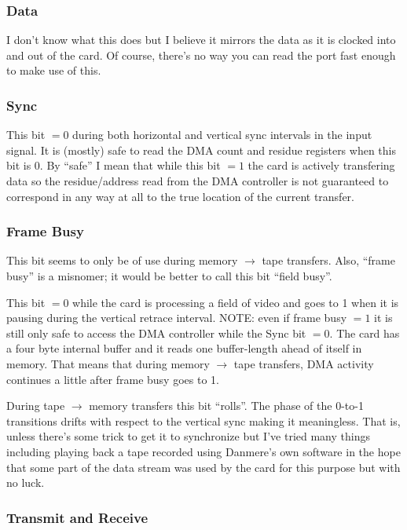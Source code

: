 \documentclass{article}
\begin{document}
\subsubsection{Data}

I don't know what this does but I believe it mirrors the data as it is
clocked into and out of the card.  Of course, there's no way you can read
the port fast enough to make use of this.


\subsubsection{Sync}

This bit \(= 0\) during both horizontal and vertical sync intervals in the
input signal.  It is (mostly) safe to read the DMA count and residue
registers when this bit is 0.  By ``safe'' I mean that while this bit \(=
1\) the card is actively transfering data so the residue/address read from
the DMA controller is not guaranteed to correspond in any way at all to the
true location of the current transfer.


\subsubsection{Frame Busy}

This bit seems to only be of use during memory \(\longrightarrow\) tape
transfers.  Also, ``frame busy'' is a misnomer;  it would be better to call
this bit ``field busy''.

This bit \(= 0\) while the card is processing a field of video and goes to
1 when it is pausing during the vertical retrace interval.  NOTE:  even if
frame busy \(= 1\) it is still only safe to access the DMA controller while
the Sync bit \(= 0\).  The card has a four byte internal buffer and it
reads one buffer-length ahead of itself in memory.  That means that during
memory \(\longrightarrow\) tape transfers, DMA activity continues a little
after frame busy goes to 1.

During tape \(\longrightarrow\) memory transfers this bit ``rolls''.  The
phase of the 0-to-1 transitions drifts with respect to the vertical sync
making it meaningless.  That is, unless there's some trick to get it to
synchronize but I've tried many things including playing back a tape
recorded using Danmere's own software in the hope that some part of the
data stream was used by the card for this purpose but with no luck.


\subsubsection{Transmit and Receive}
\end{document}
